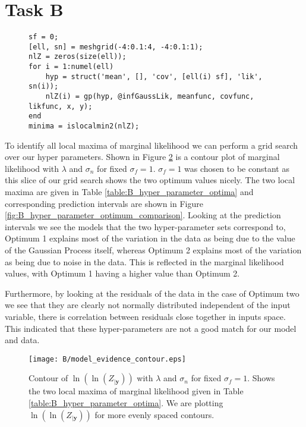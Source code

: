 \documentclass[11pt]{article}
\begin{document}
\section{Task B}

\begin{figure}[h]
\begin{lstlisting}[caption=Code to sweep $\lambda$ and $\sigma_n$ to identify local minima of $\log(Z_{|\textbf{y}})$, captionpos=b, basicstyle=\small, frame=tlrb]
sf = 0;
[ell, sn] = meshgrid(-4:0.1:4, -4:0.1:1);
nlZ = zeros(size(ell));
for i = 1:numel(ell)
    hyp = struct('mean', [], 'cov', [ell(i) sf], 'lik', sn(i));
    nlZ(i) = gp(hyp, @infGaussLik, meanfunc, covfunc, likfunc, x, y);
end
minima = islocalmin2(nlZ);
\end{lstlisting}
\label{lst:B}
\end{figure}

To identify all local maxima of marginal likelihood we can perform a grid search over our hyper parameters. Shown in Figure \ref{fig:B_marginal_liklihood_contour} is a contour plot of marginal likelihood with $\lambda$ and $\sigma_n$ for fixed $\sigma_f = 1$. $\sigma_f = 1$ was chosen to be constant as this slice of our grid search shows the two optimum values nicely. The two local maxima are given in Table \ref{table:B_hyper_parameter_optima} and corresponding prediction intervals are shown in Figure \ref{fig:B_hyper_parameter_optimum_comparison}. Looking at the prediction intervals we see the models that the two hyper-parameter sets correspond to, Optimum 1 explains most of the variation in the data as being due to the value of the Gaussian Process itself, whereas Optimum 2 explains most of the variation as being due to noise in the data. This is reflected in the marginal likelihood values, with Optimum 1 having a higher value than Optimum 2. 

Furthermore, by looking at the residuals of the data in the case of Optimum two we see that they are clearly not normally distributed independent of the input variable, there is correlation between residuals close together in inputs space. This indicated that these hyper-parameters are not a good match for our model and data.

\begin{figure}[h]
    \centering
    \texttt{[image: B/model\_evidence\_contour.eps]}
    \caption{Contour of $\ln(\ln(Z_{|\textbf{y}}))$ with $\lambda$ and $\sigma_n$ for fixed $\sigma_f = 1$. Shows the two local maxima of marginal likelihood given in Table \ref{table:B_hyper_parameter_optima}. We are plotting $\ln(\ln(Z_{|\textbf{y}}))$ for more evenly spaced contours.}
    \label{fig:B_marginal_liklihood_contour}
\end{figure}
\end{document}

